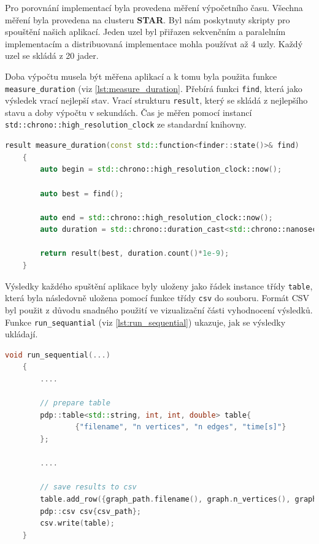 Pro porovnání implementací byla provedena měření výpočetního času.
Všechna měření byla provedena na clusteru \textbf{STAR}.
Byl nám poskytnuty skripty pro spouštění našich aplikací.
Jeden uzel byl přiřazen sekvenčním a paralelním implementacím a distribuovaná implementace mohla používat až 4 uzly.
Každý uzel se skládá z 20 jader.

Doba výpočtu musela být měřena aplikací a k tomu byla použita funkce \texttt{measure\_duration} (viz \ref{lst:measure_duration}.
Přebírá funkci \texttt{find}, která jako výsledek vrací nejlepší stav.
Vrací strukturu \texttt{result}, který se skládá z nejlepšího stavu a doby výpočtu v sekundách.
Čas je měřen pomocí instancí \texttt{std::chrono::high\_resolution\_clock} ze standardní knihovny.

\begin{lstlisting}[language=C++, label={lst:measure_duration}, caption={Funkce pro měření doby výpočtu}]
    result measure_duration(const std::function<finder::state()>& find)
    {
        auto begin = std::chrono::high_resolution_clock::now();
    
        auto best = find();
    
        auto end = std::chrono::high_resolution_clock::now();
        auto duration = std::chrono::duration_cast<std::chrono::nanoseconds>(end-begin);
    
        return result(best, duration.count()*1e-9);
    }
\end{lstlisting}

Výsledky každého spuštění aplikace byly uloženy jako řádek instance třídy \texttt{table}, která byla následovně uložena pomocí funkce třídy \texttt{csv} do souboru.
Formát CSV byl použit z důvodu snadného použití ve vizualizační části vyhodnocení výsledků.
Funkce \texttt{run\_sequantial} (viz \ref{lst:run_sequential}) ukazuje, jak se výsledky ukládají.

\begin{lstlisting}[language=C++, label={lst:run_sequential}, caption={Funkce pro měření doby výpočtu}]
    void run_sequential(...)
    {
        ....
    
        // prepare table
        pdp::table<std::string, int, int, double> table{
                {"filename", "n vertices", "n edges", "time[s]"}
        };
    
        ....
    
        // save results to csv
        table.add_row({graph_path.filename(), graph.n_vertices(), graph.n_edges(), res.duration});
        pdp::csv csv{csv_path};
        csv.write(table);
    }
\end{lstlisting}

